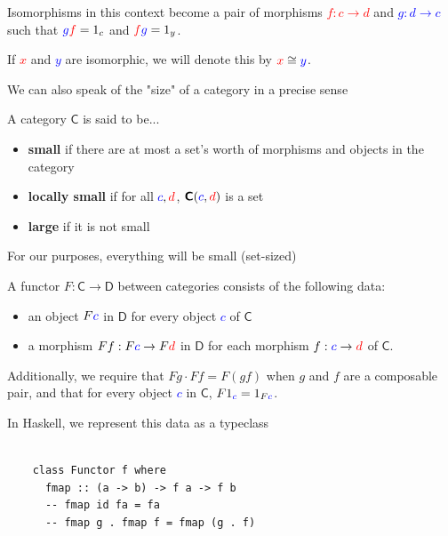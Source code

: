 \documentclass[tikz]{beamer}
\newcommand{\cat}[1]{\bm{ \mathsf{#1} }}
\newcommand{\cc}{\cat{C}}
\newcommand{\dd}{\cat{D}}
\newcommand{\red}[1]{\textcolor{red}{#1}}
\newcommand{\mred}[1]{\textcolor{red}{$#1$}}
\newcommand{\blue}[1]{\textcolor{blue}{#1}}
\newcommand{\mblue}[1]{\textcolor{blue}{$#1$}}
\theoremstyle{definition}
\begin{document}
\frame
{ 
	Isomorphisms in this context become a pair of morphisms \mred{ f : c \to d} and \mblue{g : d \to c} such that $\blue{g}\red{f} = 1_c$ and $\red{f}\blue{g} = 1_y$.
	
	 If \mred{x} and \mblue{y} are isomorphic, we will denote this by $\red{x} \cong \blue{y}$.
}

\frame
{
	We can also speak of the "size" of a category in a precise sense
}

\frame
{
	\begin{definition}
		A category $\cc$ is said to be...
		\begin{itemize}
			\item \textbf{small} if there are at most a set's worth of morphisms and objects in the category
			\item \textbf{locally small} if for all $\blue{c}, \red{d}$, $\cc(\blue{c}, \red{d})$ is a set
			\item \textbf{large} if it is not small
		\end{itemize}
	\end{definition}
}

\frame
{
	For our purposes, everything will be small (set-sized)
}

\frame
{
	
	\begin{definition}[Functor]
		A functor $F : \cc \to \dd$ between categories consists of the following data: 
		
		\begin{itemize}
			\item an object $F\blue{c}$ in $\dd$ for every object \mblue{c} of $\cc$
			\item a morphism $Ff : F\blue{c} \to F\red{d}$ in $\dd$ for each morphism $f : \blue{c} \to \red{d}$ of $\cc$.
		\end{itemize}
		
		Additionally, we require that $Fg \cdot Ff = F(gf)$ when $g$ and $f$ are a composable pair, and that for every object \mblue{c} in $\cc$, $F1_{\blue{c}} = 1_{F\blue{c}}$.
	\end{definition}
}

\begin{frame}[fragile]

In Haskell, we represent this data as a typeclass

	\begin{verbatim}
	
	class Functor f where
	  fmap :: (a -> b) -> f a -> f b
	  -- fmap id fa = fa 
	  -- fmap g . fmap f = fmap (g . f)
	\end{verbatim}
	
\end{frame}
\end{document}
